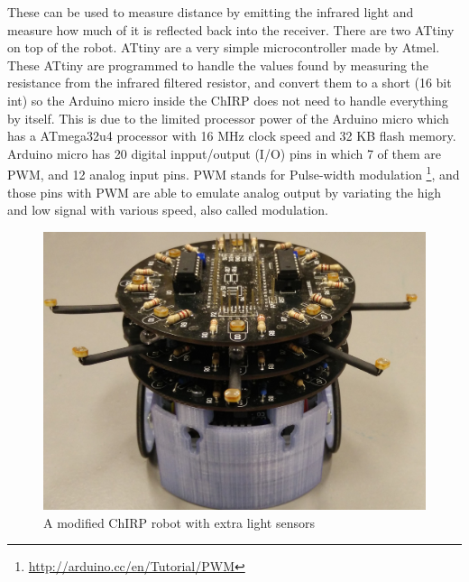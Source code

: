These can be used to measure distance by emitting the infrared light and measure how much of it is reflected back into the receiver. There are two ATtiny on top of the robot. ATtiny are a very simple microcontroller made by Atmel. These ATtiny are programmed to handle the values found by measuring the resistance from the infrared filtered resistor, and convert them to a short (16 bit int) so the Arduino micro inside the ChIRP does not need to handle everything by itself. This is due to the limited processor power of the Arduino micro which has a ATmega32u4 processor with 16 MHz clock speed and 32 KB flash memory. Arduino micro has 20 digital inpput/output (I/O) pins in which 7 of them are PWM, and 12 analog input pins. PWM stands for Pulse-width modulation \footnote{\href{http://arduino.cc/en/Tutorial/PWM}{http://arduino.cc/en/Tutorial/PWM}}, and those pins with PWM are able to emulate analog output by variating the high and low signal with various speed, also called modulation.
\begin{figure}[H]
\centering
\includegraphics[width=0.8\linewidth]{images/chirpModified}
\caption[Modified ChIRP]{A modified ChIRP robot with extra light sensors}
\label{fig:chirpmod}
\end{figure}

